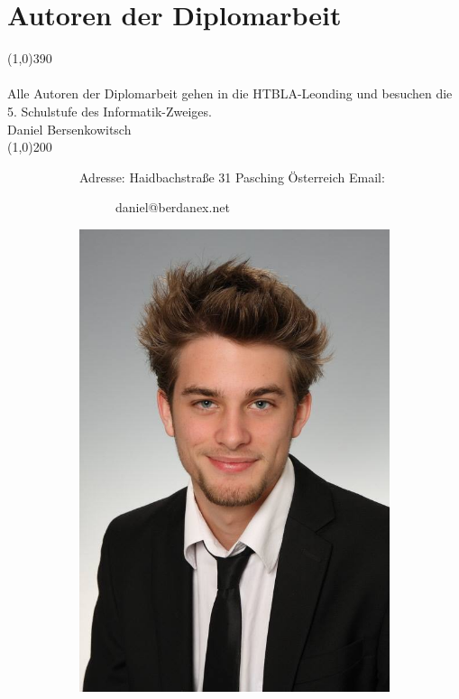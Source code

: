 \documentclass[FIPLY_base.tex]{subfiles}
\begin{document}
	\section{Autoren der Diplomarbeit}
	\line(1,0){390}
	\ \\
	\ \\
	Alle Autoren der Diplomarbeit gehen in die HTBLA-Leonding und besuchen die 5. Schulstufe des Informatik-Zweiges.
	\ \\
	\newline\newline
	{\Large Daniel Bersenkowitsch}
	\ \\
	\line(1,0){200}
	\begin{figure}[H]
		\begin{subfigure}[b]{0.3\textwidth}
			Adresse: \newline
			Haidbachstraße 31  Pasching \newline
			Österreich \newline
			\newline
			Email:
			\begin{subfigure}[b]{0.2\textwidth}
				daniel@berdanex.net
			\end{subfigure}
		\end{subfigure}
		\hfil
		\begin{subfigure}[b]{0.2\textwidth}
			\includegraphics[scale=0.1]{img/dani}
		\end{subfigure}
	\end{figure}
\end{document}
